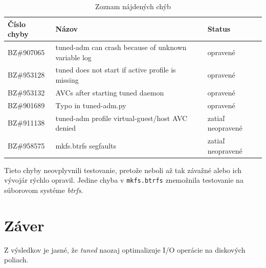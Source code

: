\begin{table}[H]
\begin{center}
\begin{tabular}{|l|l|l|}
    \hline
    \textbf{Číslo chyby} & \textbf{Názov} & \textbf{Status} \\
    \hline
    BZ\#907065 & tuned-adm can crash because of unknown variable log & opravené \\
    BZ\#953128 & tuned does not start if active profile is missing & opravené \\
    BZ\#953132 & AVCs after starting tuned daemon & opravené \\
    BZ\#901689 & Typo in tuned-adm.py & opravené \\
    BZ\#911138 & tuned-adm profile virtual-guest/host AVC denied & zatiaľ neopravené \\
    BZ\#958575 & mkfs.btrfs segfaults & zatiaľ neopravené \\
    \hline
\end{tabular}
\caption{Zoznam nájdených chýb}
\label{tab:bugs}
\end{center}
\end{table}

Tieto chyby neovplyvnili testovanie, pretože neboli až tak závažné alebo ich
vývojár rýchlo opravil. Jedine chyba v \texttt{mkfs.btrfs} znemožnila
testovanie na súborovom systéme \emph{btrfs}.


%
%

\chapter{Záver}

Z výsledkov je jasné, že \emph{tuned} naozaj optimalizuje I/O operácie na
diskových poliach. 
